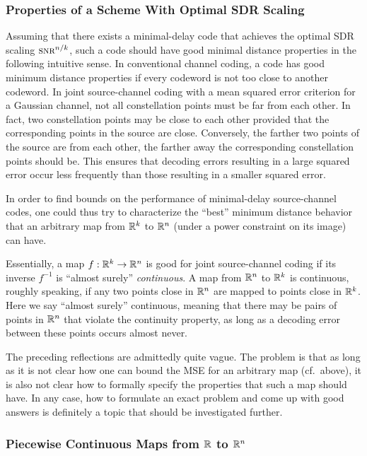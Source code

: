 \subsubsection{Properties of a Scheme With Optimal SDR Scaling}

Assuming that there exists a minimal-delay code that achieves the optimal SDR
scaling $\snr^{n/k}$, such a code should have good minimal distance properties
in the following intuitive sense. In conventional channel coding, a code has
good minimum distance properties if every codeword is not too close to another
codeword. In joint source-channel coding with a mean squared error criterion for
a Gaussian channel, not all constellation points must be far from each other. In
fact, two constellation points may be close to each other provided that the
corresponding points in the source are close. Conversely, the farther two points
of the source are from each other, the farther away the corresponding
constellation points should be.  This ensures that decoding errors resulting
in a large squared error occur less frequently than those resulting in a
smaller squared error. 

In order to find bounds on the performance of minimal-delay source-channel
codes, one could thus try to characterize the ``best'' minimum distance behavior
that an arbitrary map from $\mathbb{R}^k$ to $\mathbb{R}^n$ (under a power constraint on its
image) can have. 

Essentially, a map $f: \mathbb{R}^k \rightarrow \mathbb{R}^n$ is good for joint source-channel
coding if its inverse $f^{-1}$ is ``almost surely'' \emph{continuous}. A map
from $\mathbb{R}^n$ to $\mathbb{R}^k$ is continuous, roughly speaking, if any two points close
in $\mathbb{R}^n$ are mapped to points close in $\mathbb{R}^k$. Here we say ``almost surely''
continuous, meaning that there may be pairs of points in $\mathbb{R}^n$ that violate the
continuity property, as long as a decoding error between these points occurs
almost never.

The preceding reflections are admittedly quite vague. The problem is that as
long as it is not clear how one can bound the MSE for an arbitrary map
(cf.~above), it is also not clear how to formally specify the properties that
such a map should have. In any case, how to formulate an exact problem and
come up with good answers is definitely a topic that should be investigated
further.

\subsubsection{Piecewise Continuous Maps from $\mathbb{R}$ to $\mathbb{R}^n$}

